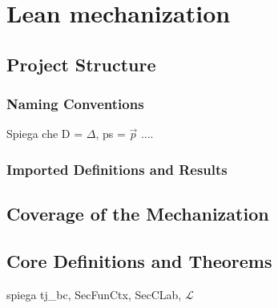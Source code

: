 \documentclass[12pt,a4paper,twoside]{book}
\newcommand{\MCL}{\mathscr{L}}
\begin{document}
\chapter{Lean mechanization}
\section{Project Structure}
\subsection{Naming Conventions}
Spiega che D = $\Delta$, ps = $\vec{p}$ ....

\subsection{Imported Definitions and Results}
\label{lean:imports}


\section{Coverage of the Mechanization}
\section{Core Definitions and Theorems}
spiega tj\_bc, SecFunCtx, SecCLab, $\MCL$
\end{document}
